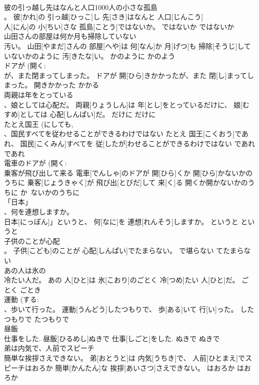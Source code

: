 \documentclass[8pt]{extreport}
\begin{document}
\begin{CJK}{UTF8}{min}
\\	彼の引っ越し先はなんと人口1000人の小さな孤島 
\\	。	彼[かれ]の 引っ越[ひっこ]し 先[さき]はなんと 人口[じんこう] 
\\	人[にん]の 小[ちい]さな 孤島[ことう]ではないか。	ではないか	ではないか	
\\	山田さんの部屋は何か月も掃除していない 
\\	汚い。	山田[やまだ]さんの 部屋[へや]は 何[なん]か 月[げつ]も 掃除[そうじ]していないかのように 汚[きたな]い。	かのように	かのよう	
\\	ドアが (開く: 
\\	が、また閉まってしまった。	ドアが 開[ひら]きかかったが、また 閉[し]まってしまった。	開きかかった	かかる	
\\	両親は年をとっている
\\	、娘としては心配だ。	両親[りょうしん]は 年[とし]をとっているだけに、 娘[むすめ]としては 心配[しんぱい]だ。	だけに	だけに	
\\	たとえ国王 (にしても, 
\\	、国民すべてを従わせることができるわけではない	たとえ 国王[こくおう]であれ、 国民[こくみん]すべてを 従[したが]わせることができるわけではない	であれ	であれ	
\\	電車のドアが (開く: 
\\	乗客が飛び出して来る	電車[でんしゃ]のドアが 開[ひら]くか 開[ひら]かないかのうちに 乗客[じょうきゃく]が 飛び出[とびだ]して 来[く]る	開くか開かないかのうちに	か~ないかのうちに	
\\	「日本」
\\	、何を連想しますか。	
\\	日本[にっぽん]」というと、 何[なに]を 連想[れんそう]しますか。	というと	というと	
\\	子供のことが心配 
\\	。	子供[こども]のことが 心配[しんぱい]でたまらない。	で堪らない	てたまらない	
\\	あの人は氷の 
\\	冷たい人だ。	あの 人[ひと]は 氷[こおり]のごとく 冷[つめ]たい 人[ひと]だ。	ごとく	ごとき	
\\	運動 (する: 
\\	、歩いて行った。	運動[うんどう]したつもりで、 歩[ある]いて 行[い]った。	したつもりで	たつもりで	
\\	昼飯 
\\	仕事をした.	昼飯[ひるめし]ぬきで 仕事[しごと]をした.	ぬきで	ぬきで	
\\	弟は内気で、人前でスピーチ 
\\	簡単な挨拶さえできない。	弟[おとうと]は 内気[うちき]で、 人前[ひとまえ]でスピーチはおろか 簡単[かんたん]な 挨拶[あいさつ]さえできない。	はおろか	はおろか	

\end{CJK}
\end{document}
